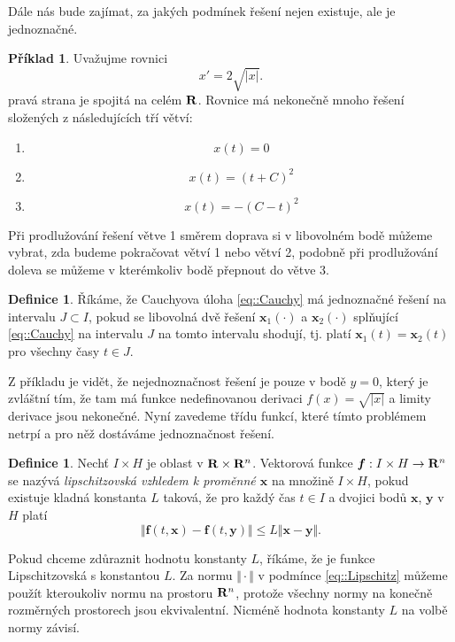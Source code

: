 \documentclass[a4paper, 12pt]{book}
\theoremstyle{definition}
\newtheorem{definition}[theorem]{Definice}
\newtheorem{example}[theorem]{Příklad}
\def\to{\rightarrow}
\def\Real{{\rm\bf R}}
\def\vc#1{\mathbf{\boldsymbol{#1}}}     %
\def\abs#1{\lvert#1\rvert}
\def\norm#1{\bigl\Vert#1\bigr\Vert} %
\def\df#1{\emph{#1}}
\begin{document}
Dále nás bude zajímat, za jakých podmínek řešení nejen existuje, ale je jednoznačné. 
\begin{example}
Uvažujme rovnici
\[
 x' = 2\sqrt{\abs{x}}.
\]
pravá strana je spojitá na celém $\Real$. Rovnice má nekonečně mnoho řešení složených z následujících tří větví:
\begin{enumerate}
 \item \[ x(t)=0\]
 \item \[ x(t)= (t+C)^2 \]
 \item \[ x(t)= -(C-t)^2 \]
\end{enumerate}
Při prodlužování řešení větve 1 směrem doprava si v libovolném bodě můžeme vybrat, zda budeme pokračovat větví 1 nebo větví 2, podobně při prodlužování doleva se můžeme v kterémkoliv bodě 
přepnout do větve 3. 
\end{example}

\begin{definition}
Říkáme, že Cauchyova úloha \eqref{eq::Cauchy}
má jednoznačné řešení na intervalu $J \subset I$, pokud se libovolná dvě řešení $\vc x_1(\cdot)$ a $\vc x_2(\cdot)$
splňující \eqref{eq::Cauchy} na intervalu $J$ na tomto intervalu shodují, tj. platí $\vc x_1(t) = \vc x_2(t)$ pro všechny časy $t\in J$.
\end{definition}

Z příkladu je vidět, že nejednoznačnost řešení je pouze v bodě $y=0$, který je zvláštní tím, že tam má funkce nedefinovanou derivaci $f(x) = \sqrt{\abs{x}}$ 
a limity derivace jsou nekonečné. Nyní zavedeme třídu funkcí, které tímto problémem netrpí a pro něž dostáváme jednoznačnost řešení.
\begin{definition}
Nechť $I\times H$ je oblast v $\Real \times \Real^n$. Vektorová funkce $\vc f:I \times H\to \Real^n$ se
nazývá \df{lipschitzovská vzhledem k proměnné $\vc x$} na množině $I\times H$, pokud existuje kladná konstanta $L$ taková, že
pro každý čas  $t\in I$ a dvojici bodů $\vc x$, $\vc y$ v $H$ platí
\begin{equation}
    \label{eq::Lipschitz}
    \norm{ \vc f(t,\vc x)- \vc f(t,\vc y) } \leq L \norm{ \vc x-\vc y}.
\end{equation}
\end{definition}
Pokud chceme zdůraznit hodnotu konstanty $L$, říkáme, že je funkce Lipschitzovská s konstantou $L$. 
Za normu $\norm{\cdot}$ v podmínce \eqref{eq::Lipschitz} můžeme použít kteroukoliv normu na prostoru $\Real^n$, protože
všechny normy na konečně rozměrných prostorech jsou ekvivalentní. Nicméně hodnota konstanty $L$ na volbě normy závisí.
\end{document}
